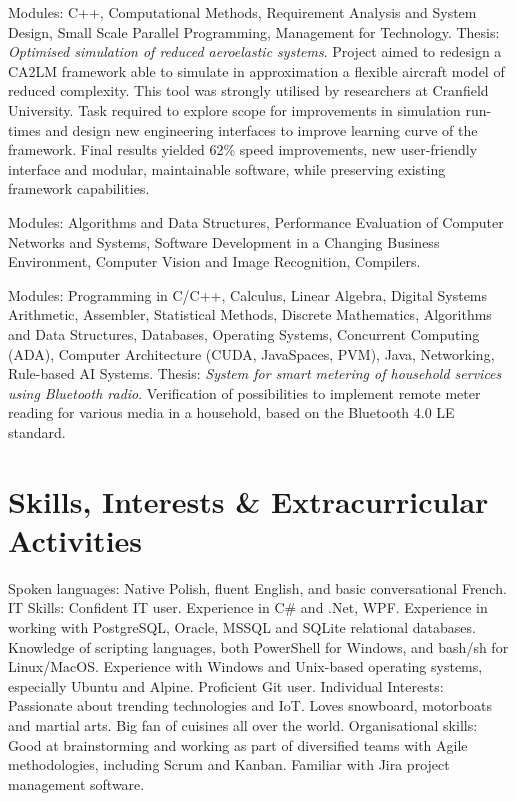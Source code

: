 \documentclass[12pt,english]{resume}
\begin{document}
			Modules: C++, Computational Methods, Requirement Analysis and System Design, Small Scale Parallel Programming, Management for Technology.
			Thesis: \emph{Optimised simulation of reduced aeroelastic systems}.
			Project aimed to redesign a CA2LM framework able to simulate in approximation a flexible aircraft model of reduced complexity. This tool was strongly utilised by researchers at Cranfield University. Task required to explore scope for improvements in simulation run-times and design new engineering interfaces to improve learning curve of the framework. Final results yielded 62\% speed improvements, new user-friendly interface and modular, maintainable software, while preserving existing framework capabilities.

			Modules: Algorithms and Data Structures, Performance Evaluation of Computer Networks and Systems, Software Development in a Changing Business Environment, Computer Vision and Image Recognition, Compilers.

			Modules: Programming in C/C++, Calculus, Linear Algebra, Digital Systems Arithmetic, Assembler, Statistical Methods, Discrete Mathematics, Algorithms and Data Structures, Databases, Operating Systems, Concurrent Computing (ADA), Computer Architecture (CUDA, JavaSpaces, PVM), Java, Networking, Rule-based AI Systems.
			Thesis: \emph{System for smart metering of household services using Bluetooth radio}.
			Verification of possibilities to implement remote meter reading for various media in a household, based on the Bluetooth 4.0 LE standard.

	\section{Skills, Interests \& Extracurricular Activities}
		Spoken languages: Native Polish, fluent English, and basic conversational French.
		IT Skills: Confident IT user. Experience in C\# and .Net, WPF. Experience in working with PostgreSQL, Oracle, MSSQL and SQLite relational databases. Knowledge of scripting languages, both PowerShell for Windows, and bash/sh for Linux/MacOS. Experience with Windows and Unix-based operating systems, especially Ubuntu and Alpine. Proficient Git user.
		Individual Interests: Passionate about trending technologies and IoT. Loves snowboard, motorboats and martial arts. Big fan of cuisines all over the world.
		Organisational skills: Good at brainstorming and working as part of diversified teams with Agile methodologies, including Scrum and Kanban. Familiar with Jira project management software.
\end{document}
